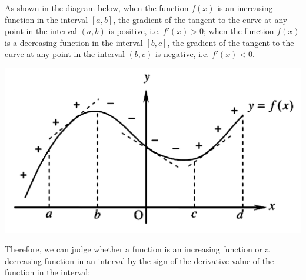 As shown in the diagram below, when the function $f(x)$ is an increasing
function in the interval $[a, b]$, the gradient of the tangent to the curve at
any point in the interval $(a, b)$ is positive, i.e. $f'(x) > 0$; when the
function $f(x)$ is a decreasing function in the interval $[b, c]$, the gradient
of the tangent to the curve at any point in the interval $(b, c)$ is negative,
i.e. $f'(x) < 0$.
\begin{center}
    \includegraphics[scale=0.25]{assets/26-5.png}
\end{center}
Therefore, we can judge whether a function is an increasing function or a decreasing function in an interval by the sign of the derivative value of the function in the interval:
\begin{center}
\end{center}
\vspace{0.9em}




